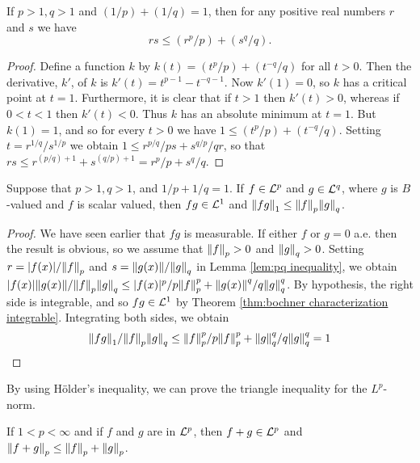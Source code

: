 \begin{lemma}\label{lem:pq inequality}
If $p>1,q>1$ and $(1/p)+(1/q)=1$, then for any positive real numbers $r$ and $s$ we have $$rs\leq(r^p/p)+(s^q/q).$$
\end{lemma}

\begin{proof}
Define a function $k$ by $k(t)=(t^p/p)+(t^{-q}/q)$ for all $t>0$. Then the derivative, $k'$, of $k$ is $k'(t)=t^{p-1}-t^{-q-1}$. Now $k'(1)=0$, so $k$ has a critical point at $t=1$. Furthermore, it is clear that if $t>1$ then $k'(t)>0$, whereas if $0<t<1$ then $k'(t)<0$. Thus $k$ has an absolute minimum at $t=1$. But $k(1)=1$, and so for every $t>0$ we have $1\leq(t^p/p)+(t^{-q}/q)$. Setting $t=r^{1/q}/s^{1/p}$ we obtain $1\leq r^{p/q}/ps+s^{q/p}/qr$, so that $rs\leq r^{(p/q)+1}+s^{(q/p)+1}=r^p/p+s^q/q$.
\end{proof}

\begin{theorem}\label{thm:holders}
Suppose that $p>1, q>1$, and $1/p+1/q=1$. If $f\in{\cal L}^p$ and $g\in{\cal L}^q$, where $g$ is $B$-valued and $f$ is scalar valued, then $fg\in{\cal L}^1$ and $\norm{fg}_1\leq\norm{f}_p\norm{g}_q$.
\end{theorem}

\begin{proof}
We have seen earlier that $fg$ is measurable. If either $f$ or $g=0$ a.e. then the result is obvious, so we assume that $\norm{f}_p>0$ and $\norm{g}_q>0$. Setting $r=|f(x)|/\norm{f}_p$ and $s=\norm{g(x)}/\norm{g}_q$ in Lemma \ref{lem:pq inequality}, we obtain $|f(x)|\norm{g(x)}/\norm{f}_p\norm{g}_q\leq|f(x)|^p/p\norm{f}_p^p+\norm{g(x)}^q/q\norm{g}_q^q$. By hypothesis, the right side is integrable, and so $f g\in {\cal L}^1$ by Theorem \ref{thm:bochner characterization integrable}. Integrating both sides, we obtain $$\norm{fg}_1/\norm{f}_p\norm{g}_q\leq\norm{f}_p^p/p\norm{f}_p^p+\norm{g}_q^q/q\norm{g}_q^q=1$$
\end{proof}

By using H\"older's inequality, we can prove the triangle inequality for the $L^p$-norm.

\begin{theorem}\label{thm:minkowski inequality}
If $1<p<\infty$ and if $f$ and $g$ are in ${\cal L}^p$, then $f+g\in{\cal L}^p$ and $\norm{f+g}_p\leq\norm{f}_p+\norm{g}_p$.
\end{theorem}

